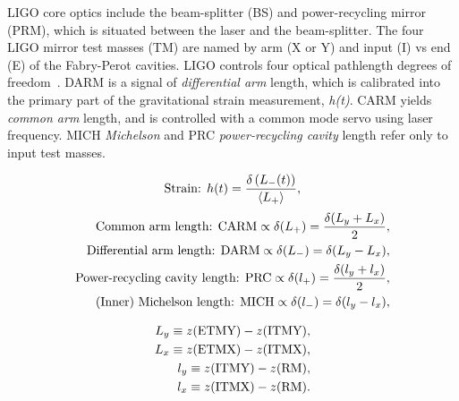 LIGO core optics include the beam-splitter (BS) and power-recycling mirror (PRM), which is situated between the laser and the beam-splitter. The four LIGO mirror test masses (TM) are named by arm (X or Y) and input (I) vs end (E) of the Fabry-Perot cavities. LIGO controls four optical pathlength degrees of freedom~\cite{ReadoutGWA}. DARM is a signal of \textit{differential arm} length, which is calibrated into the primary part of the gravitational strain measurement, \textit{h(t)}. CARM yields \textit{common arm} length, and is controlled with a common mode servo using laser frequency. MICH \textit{Michelson} and PRC \textit{power-recycling cavity} length refer only to input test masses.

        \begin{eqnarray}
        \textup{Strain: } h(t) = \frac{\delta \left(L_{-}(t) \right)}{\langle L_{+}\rangle}, \label{hoftDef}
        \end{eqnarray}
        \begin{eqnarray}
        \textup{Common arm length: } \textup{CARM} \propto \delta(L_{+}) = \frac{\delta(L_y + L_x)}{2}, \label{CARMdef} \\
        \textup{Differential arm length: } \textup{DARM} \propto \delta(L_{-}) = \delta(L_y - L_x), \label{DARMdef} \\
        \textup{Power-recycling cavity length: }\textup{PRC} \propto \delta(l_{+}) = \frac{\delta(l_y + l_x)}{2}, \label{PRCdef} \\
        \textup{(Inner) Michelson length: } \textup{MICH} \propto \delta(l_{-}) = \delta(l_y - l_x), \label{MICHdef}
        \end{eqnarray}

        \begin{eqnarray}
        L_y \equiv z(\textup{ETMY}) - z(\textup{ITMY}), \label{Lydef} \\
        L_x \equiv z(\textup{ETMX}) - z(\textup{ITMX}), \label{Lxdef} \\
        l_y \equiv z(\textup{ITMY}) - z(\textup{RM}), \label{lydef} \\
        l_x \equiv z(\textup{ITMX}) - z(\textup{RM}). \label{lxdef}
        \end{eqnarray}

